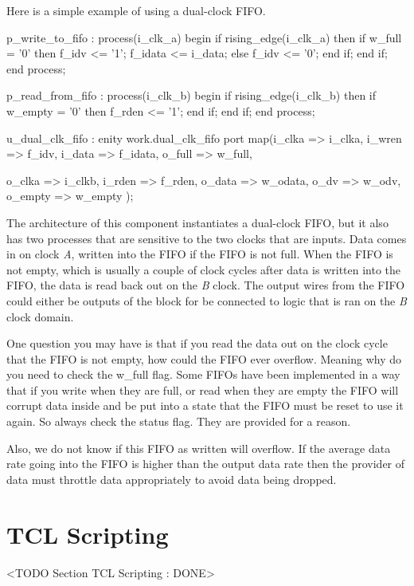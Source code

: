 Here is a simple example of using a dual-clock \ac{FIFO}.

\begin{VHDLlisting}[tabsize=4]
p_write_to_fifo : process(i_clk_a)
begin
    if rising_edge(i_clk_a) then
        if w_full = '0' then
            f_idv <= '1';
            f_idata <= i_data;
        else
            f_idv <= '0';
        end if;
    end if;	
end process;

p_read_from_fifo : process(i_clk_b)
begin	
    if rising_edge(i_clk_b) then
        if w_empty = '0' then
            f_rden <= '1';
        end if;
    end if;
end process;

u_dual_clk_fifo : enity work.dual_clk_fifo
port map(i_clka  => i_clka, 
         i_wren  => f_idv,
         i_data  => f_idata,
         o_full  => w_full,
         
         o_clka  => i_clkb,
         i_rden  => f_rden,
         o_data  => w_odata,
         o_dv    => w_odv,
         o_empty => w_empty
);
\end{VHDLlisting}

The architecture of this component instantiates a dual-clock \ac{FIFO}, but it also has two processes that are sensitive to the two clocks that are inputs. Data comes in on clock \emph{A}, written into the \ac{FIFO} if the \ac{FIFO} is not full. When the \ac{FIFO} is not empty, which is usually a couple of clock cycles after data is written into the \ac{FIFO}, the data is read back out on the \emph{B} clock. The output wires from the \ac{FIFO} could either be outputs of the block for be connected to logic that is ran on the \emph{B} clock domain. 

One question you may have is that if you read the data out on the clock cycle that the \ac{FIFO} is not empty, how could the \ac{FIFO} ever overflow. Meaning why do you need to check the w\_full flag. Some \ac{FIFO}s have been implemented in a way that if you write when they are full, or read when they are empty the \ac{FIFO} will corrupt data inside and be put into a state that the \ac{FIFO} must be reset to use it again. So always check the status flag. They are provided for a reason.

Also, we do not know if this \ac{FIFO} as written will overflow. If the average data rate going into the \ac{FIFO} is higher than the output data rate then the provider of data must throttle data appropriately to avoid data being dropped. 

	
\section{TCL Scripting}
	<TODO Section TCL Scripting : DONE>

